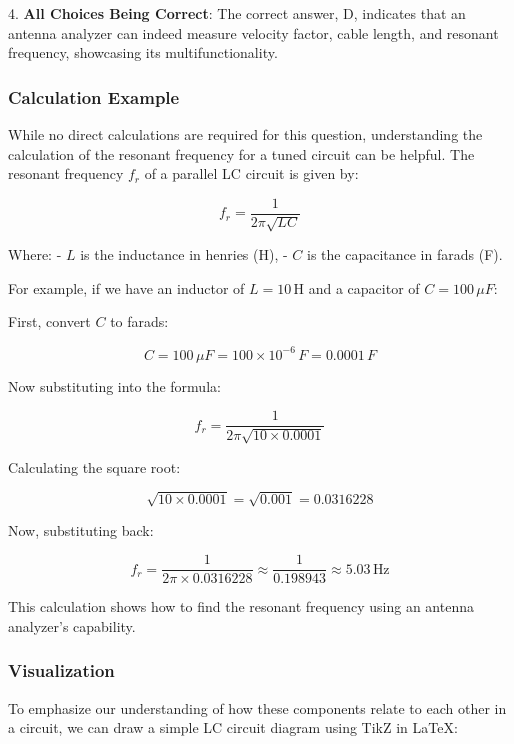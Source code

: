 4. \textbf{All Choices Being Correct}: The correct answer, D, indicates that an antenna analyzer can indeed measure velocity factor, cable length, and resonant frequency, showcasing its multifunctionality.

\subsubsection*{Calculation Example}

While no direct calculations are required for this question, understanding the calculation of the resonant frequency for a tuned circuit can be helpful. The resonant frequency \( f_{r} \) of a parallel LC circuit is given by:

\[
f_{r} = \frac{1}{2\pi\sqrt{LC}}
\]

Where:
- \( L \) is the inductance in henries (H),
- \( C \) is the capacitance in farads (F).

For example, if we have an inductor of \( L = 10 \, \text{H} \) and a capacitor of \( C = 100 \, \mu F \):

First, convert \( C \) to farads:

\[
C = 100 \, \mu F = 100 \times 10^{-6} \, F = 0.0001 \, F
\]

Now substituting into the formula:

\[
f_{r} = \frac{1}{2\pi\sqrt{10 \times 0.0001}}
\]

Calculating the square root:

\[
\sqrt{10 \times 0.0001} = \sqrt{0.001} = 0.0316228
\]

Now, substituting back:

\[
f_{r} = \frac{1}{2\pi \times 0.0316228} \approx \frac{1}{0.198943} \approx 5.03 \, \text{Hz}
\]

This calculation shows how to find the resonant frequency using an antenna analyzer's capability.

\subsubsection*{Visualization}

To emphasize our understanding of how these components relate to each other in a circuit, we can draw a simple LC circuit diagram using TikZ in LaTeX:

\begin{center}
\end{center}
